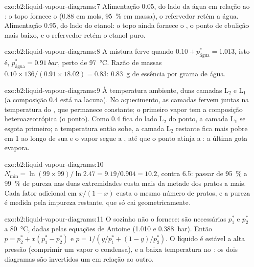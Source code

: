 \begin{solution}{exo:b2:liquid-vapour-diagrams:7}
Alimentação 0.05, do lado da água em relação ao : o topo fornece o
 (0.88 em mols, 95~\% em massa), o refervedor retém a água.
Alimentação 0.95, do lado do etanol: o topo ainda fornece o , o ponto
de ebulição mais baixo, e o refervedor retém o etanol puro.
\end{solution}

\begin{solution}{exo:b2:liquid-vapour-diagrams:8}
A mistura ferve quando $0.10 + p^*_{\text{água}} = 1.013$, isto é,
$p^*_{\text{água}} = \qty{0.91}{bar}$, perto de \qty{97}{\degreeCelsius}. Razão de
massas $0.10 \times 136/(0.91 \times 18.02) = 0.83$: \qty{0.83}{g} de essência por
grama de água.
\end{solution}

\begin{solution}{exo:b2:liquid-vapour-diagrams:9}
À temperatura ambiente, duas camadas L$_2$ e L$_1$ (a composição 0.4 está na
lacuna). No aquecimento, as camadas fervem juntas na temperatura do
, que permanece constante; o primeiro vapor tem a composição
heteroazeotrópica (o ponto). Como 0.4 fica do lado L$_2$ do ponto, a camada
L$_1$ se esgota primeiro; a temperatura então sobe, a camada L$_2$ restante
fica mais pobre em 1 ao longo de sua  e o vapor segue a , até que o ponto atinja a : a última gota evapora.
\end{solution}

\begin{solution}{exo:b2:liquid-vapour-diagrams:10}
$N_{\min} = \ln(99 \times 99)/\ln 2.47 = 9.19/0.904 = 10.2$, contra 6.5: passar
de 95~\% a 99~\% de pureza nas duas extremidades custa mais da metade dos
pratos a mais. Cada fator adicional em $x/(1 - x)$ custa o mesmo número de
pratos, e a pureza é medida pela impureza restante, que só cai geometricamente.
\end{solution}

\begin{solution}{exo:b2:liquid-vapour-diagrams:11}
O  sozinho não o fornece: são necessárias $p_1^*$ e $p_2^*$ a
\qty{80}{\degreeCelsius}, dadas pelas equações de Antoine (1.010 e
\qty{0.388}{bar}). Então $p = p_2^* + x(p_1^* - p_2^*)$ e $p = 1/(y/p_1^* + (1 -
y)/p_2^*)$. O líquido é estável a alta pressão (comprimir um vapor o
condensa), e a baixa temperatura no : os dois diagramas
são invertidos um em relação ao outro.
\end{solution}


